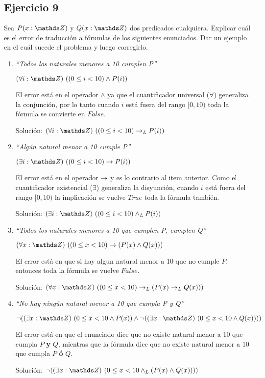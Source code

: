 \subsection{Ejercicio 9}
Sea $P(x: \ent)$ y $Q(x: \ent)$ dos predicados cualquiera. Explicar cuál es el error de traducción a fórumlas de los siguientes enunciados. Dar un ejemplo en el cuál sucede el problema y luego corregirlo.

\begin{enumerate}[label=\alph*)]
      \item \textit{``Todos los naturales menores a 10 cumplen P''}

            $\paraTodo{i}{\ent}{(0 \leq i < 10) \land P(i)}$

            El error está en el operador $\land$ ya que el cuantificador universal ($\forall$) generaliza la conjunción, por lo tanto cuando $i$ está fuera del rango $[0,10)$ toda la fórmula se convierte en $False$.

            Solución: $\paraTodo{i}{\ent}{(0 \leq i < 10) \thenLuego P(i)}$

      \item \textit{``Algún natural menor a 10 cumple P''}

            $\existe{i}{\ent}{(0 \leq i < 10) \Then P(i)}$

            El error está en el operador $\rightarrow$ y es lo contrario al item anterior. Como el cuantificador existencial ($\exists$) generaliza la disyunción, cuando $i$ está fuera del rango $[0,10)$ la implicación se vuelve $True$ toda la fórmula también.

            Solución: $\existe{i}{\ent}{(0 \leq i < 10) \yLuego P(i)}$

      \item \textit{``Todos los naturales menores a 10 que cumplen P, cumplen Q''}

            $\paraTodo{x}{\ent}{(0 \leq x < 10) \Then (P(x) \land Q(x))}$

            El error está en que si hay algun natural menor a 10 que no cumple $P$, entonces toda la fórmula se vuelve $False$.

            Solución: $\paraTodo{x}{\ent}{(0 \leq x < 10) \thenLuego (P(x) \thenLuego Q(x))}$

      \item \textit{``No hay ningún natural menor a 10 que cumpla P y Q''}

            $\neg (\existe{x}{\ent}{0 \leq x < 10 \land P(x)} \land \neg (\existe{x}{\ent}{0 \leq x < 10 \land Q(x)}))$

            El error está en que el enunciado dice que no existe natural menor a 10 que cumpla $P$ \textbf{y} $Q$, mientras que la fórmula dice que no existe natural menor a 10 que cumpla $P$ \textbf{ó} $Q$.

            Solución: $\neg (\existe{x}{\ent}{0 \leq x < 10 \yLuego (P(x) \land Q(x))})$

\end{enumerate}

